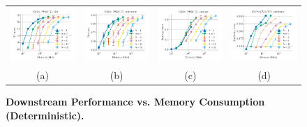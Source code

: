 \begin{figure}
	\centering
	\begin{tabular}{@{\hskip -0.0in}c@{\hskip -0.0in}c@{\hskip -0.0in}c@{\hskip -0.0in}c@{\hskip -0.0in}}
		\includegraphics[width=.245\linewidth]{figures/glove-wiki400k-am_qa_best-f1_vs_compression_linx_det_uni-quant-only.pdf} &
		\includegraphics[width=.245\linewidth]{figures/glove-wiki400k-am_sentiment_sst_test-acc_vs_compression_linx_det_uni-quant-only.pdf} &
		\includegraphics[width=.245\linewidth]{figures/glove-wiki400k-am_intrinsics_google-mul_vs_compression_linx_det_uni-quant-only.pdf} &
		\includegraphics[width=.245\linewidth]{figures/glove-wiki400k-am_intrinsics_bruni_men_vs_compression_linx_det_uni-quant-only.pdf} \\
		\;\;\;\;\;(a) & \;\;\;\;\;\;(b) & \;\;\;\;\;\;(c) & \;\;\;\;\;\;(d)
	\end{tabular}
	\caption{
		\textbf{Downstream Performance vs. Memory Consumption (Deterministic).}	}
	\label{fig:perf_comp_wiki17only_det}
\end{figure}


